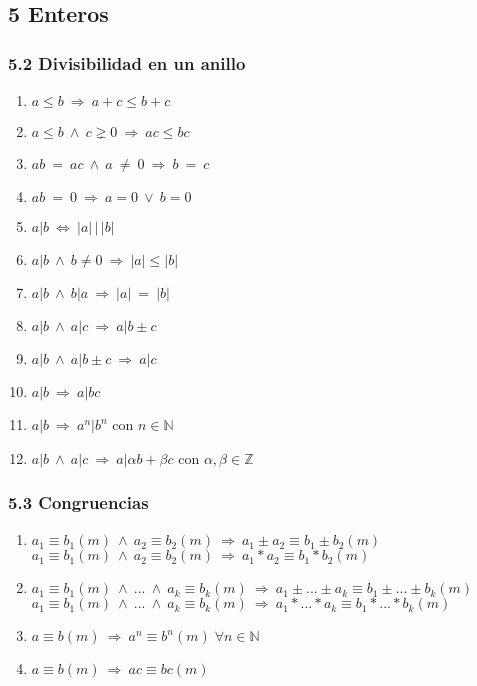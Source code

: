 \documentclass{article}
\newcommand{\lands}{\:\land\:}                          %
\newcommand{\vees}{\:\vee\:}                            %
\newcommand{\eq}{\:=\:}                                 %
\newcommand{\neqs}{\:\neq\:}                            %
\newcommand{\Rightarrows}{\: \Rightarrow \:}            %
\newcommand{\Leftrightarrows}{\: \Leftrightarrow \:}    %
\begin{document}
\subsection*{5 Enteros}
\subsubsection*{5.2 Divisibilidad en un anillo}
\begin{enumerate}
    \item $a \leq b \Rightarrows a + c \leq b + c$
    \item $a \leq b \lands c \gneq 0 \Rightarrows ac \leq bc$ 
    \item $ab \eq ac \lands a \neqs 0 \Rightarrows  b \eq c$
    \item $ab \eq 0 \Rightarrows a = 0 \vees b = 0$
    \item $a|b \Leftrightarrows |a|\,|\,|b|$
    \item $a|b \lands b \neq 0 \Rightarrows |a| \leq |b|$
    \item $a|b \lands b|a \Rightarrows |a| \eq |b|$
    \item $a|b \lands a|c \Rightarrows a | b \pm c$ 
    \item $a|b \lands a|b \pm c \Rightarrows a|c$
    \item $a|b \Rightarrows a|bc$
    \item $a|b \Rightarrows a^n | b^n$ con $n \in \mathbb{N}$
    \item $a|b \lands a|c \Rightarrows a|\alpha b+\beta c$ con $\alpha, \beta \in \mathbb{Z}$
\end{enumerate}
\subsubsection*{5.3 Congruencias}
\begin{enumerate}
    \item $a_1 \equiv b_1 (m) \lands a_2 \equiv b_2 (m) \Rightarrows a_1 \pm a_2 \equiv b_1 \pm b_2 (m)$
    \\ $a_1 \equiv b_1 (m) \lands a_2 \equiv b_2 (m) \Rightarrows a_1 * a_2 \equiv b_1 * b_2 (m)$
    \item $a_1 \equiv b_1 (m) \lands ... \lands a_k \equiv b_k (m) \Rightarrows a_1 \pm ... \pm a_k \equiv b_1 \pm ... \pm b_k (m)$
    \\ $a_1 \equiv b_1 (m) \lands ... \lands a_k \equiv b_k (m) \Rightarrows a_1 * ... * a_k \equiv b_1 * ... * b_k (m)$
    \item $a \equiv b (m) \Rightarrows a^n \equiv b^n (m) \; \forall n \in \mathbb{N}$
    \item $a \equiv b (m) \Rightarrows ac \equiv bc (m)$
\end{enumerate}
\end{document}
